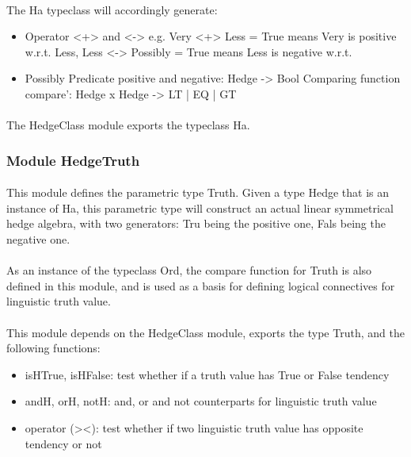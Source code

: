 \documentclass[../gr-final.tex]{subfiles}
\begin{document}
\paragraph{}The Ha typeclass will accordingly generate:

\begin{itemize}
\item Operator <+> and <-> e.g. Very <+> Less = True means Very is
  positive w.r.t. Less, Less <-> Possibly = True means Less is
  negative w.r.t. 
\item Possibly Predicate positive and negative: Hedge ->
  Bool Comparing function compare': Hedge x Hedge -> LT | EQ | GT
\end{itemize}

\paragraph{}The HedgeClass module exports the typeclass Ha.

\subsubsection{Module HedgeTruth}


\paragraph{}This module defines the parametric type Truth. Given a type Hedge that is an instance of Ha, this parametric type will construct an actual linear symmetrical hedge algebra, with two generators: Tru being the positive one, Fals being the negative one. \\

\paragraph{}As an instance of the typeclass Ord, the compare function for Truth is also defined in this module, and is used as a basis for defining logical connectives for linguistic truth value.\\

\paragraph{}This module depends on the HedgeClass module, exports the type Truth, and the following functions:

\begin{itemize}
\item isHTrue, isHFalse: test whether if a truth value has True or
  False tendency 
\item andH, orH, notH: and, or and not counterparts for
  linguistic truth value 
\item operator (><): test whether if two linguistic
  truth value has opposite tendency or not
\end{itemize}
\end{document}
